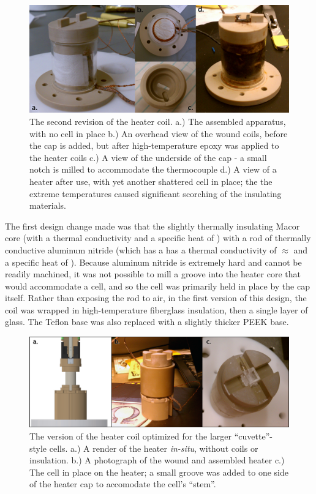 \documentclass[PaulGanssle-Thesis.tex]{subfiles}
\begin{document}
\begin{figure}[ht!]
\includegraphics[width=\tw]{figures/magnetometer/HeaterSmallCellSmaller.png}
\caption{The second revision of the heater coil. a.) The assembled apparatus, with no cell in place b.) An overhead view of the wound coils, before the cap is added, but after high-temperature epoxy was applied to the heater coils c.) A view of the underside of the cap - a small notch is milled to accommodate the thermocouple d.) A view of a heater after use, with yet another shattered cell in place; the the extreme temperatures caused significant scorching of the insulating materials.}
\label{fig:RevisedHeaterCoilSmallCell}
\end{figure}

The first design change made was that the slightly thermally insulating Macor core (with a thermal conductivity  and a specific heat of ) with a rod of thermally conductive aluminum nitride (which has a has a thermal conductivity of $\approx$ and a specific heat of ). Because aluminum nitride is extremely hard and cannot be readily machined, it was not possible to mill a groove into the heater core that would accommodate a cell, and so the cell was primarily held in place by the cap itself. Rather than exposing the rod to air, in the first version of this design, the coil was wrapped in high-temperature fiberglass insulation, then a single layer of glass. The Teflon base was also replaced with a slightly thicker PEEK base. 

\begin{figure}[ht!]
\includegraphics[width=\tw]{figures/magnetometer/HeaterLargeCellSmaller.png}
\caption{The version of the heater coil optimized for the larger ``cuvette''-style cells. a.) A render of the heater \textit{in-situ}, without coils or insulation. b.) A photograph of the wound and assembled heater c.) The cell in place on the heater; a small groove was added to one side of the heater cap to accomodate the cell's ``stem''.}
\label{fig:RevisedHeaterCoilLargeCell}
\end{figure}
\end{document}
